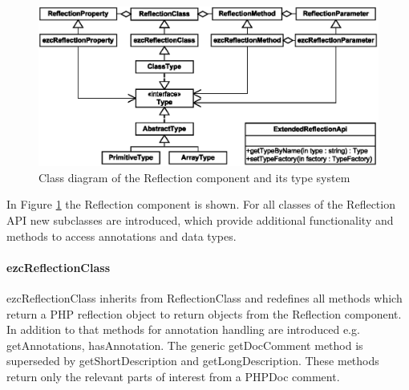 \documentclass[10pt,final,a4paper,oneside]{article}
\begin{document}
\begin{figure}[htbp]
	\centering
		\includegraphics[width=1.00\textwidth]{figures/ezcReflection.eps}
	\caption{Class diagram of the Reflection component and its type system}
	\label{fig:ezcReflection}
\end{figure}


In Figure \ref{fig:ezcReflection} the Reflection component is shown.
For all classes of the Reflection API 
new subclasses are introduced,
which provide additional functionality and methods to access
annotations and data types.

\paragraph{ezcReflectionClass}
ezcReflectionClass inherits from ReflectionClass
and redefines all methods which return a PHP reflection object
to return objects from the Reflection component.
In addition to that
methods for annotation handling
are introduced e.g. 
getAnnotations,
hasAnnotation.
The generic getDocComment method is superseded
by getShortDescription and getLongDescription.
These methods return only the relevant parts
of interest from a PHPDoc comment.

\end{document}
